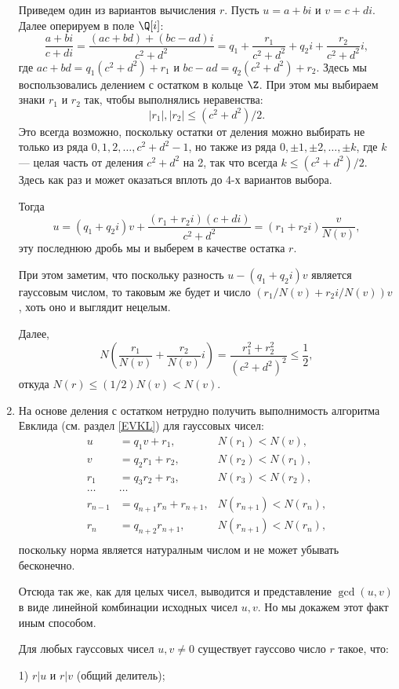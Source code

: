 \begin{enumerate}
Приведем один из вариантов вычисления $r$. Пусть $u=a+bi$ и $v=c+di$. Далее оперируем в поле $\Q[i]$:
$$
\frac{a+bi}{c+di}=\frac{(ac+bd)+(bc-ad)i}{c^2+d^2}=q_1+\frac{r_1}{c^2+d^2}+q_2i+\frac{r_2}{c^2+d^2}i,
$$
где $ac+bd=q_1(c^2+d^2)+r_1$ и $bc-ad=q_2(c^2+d^2)+r_2$. Здесь мы воспользовались делением с остатком в кольце $\Z$. При этом мы выбираем знаки $r_1$ и $r_2$ так, чтобы выполнялись неравенства:
$$
|r_1|,|r_2|\le (c^2+d^2)/2.
$$
Это всегда возможно, поскольку остатки от деления можно выбирать не только из ряда $0,1,2,\dots,c^2+d^2-1$, но также из ряда
$0,\pm 1,\pm 2,\dots,\pm k$, где $k$ --- целая часть от деления $c^2+d^2$ на 2, так что всегда $k\le(c^2+d^2)/2$. Здесь как раз и может оказаться вплоть до 4-х вариантов выбора.

Тогда
$$
u=(q_1+q_2i)v+\frac{(r_1+r_2i)(c+di)}{c^2+d^2}=(r_1+r_2i)\frac{v}{N(v)},
$$
эту последнюю дробь мы и выберем в качестве остатка $r$.

При этом заметим, что поскольку разность $u-(q_1+q_2i)v$ является гауссовым числом, то таковым же будет и число $(r_1/N(v)+r_2i/N(v))v$, хоть оно и выглядит нецелым.

Далее,
$$
N\left(\frac{r_1}{N(v)}+\frac{r_2}{N(v)}i\right)=\frac{r_1^2+r_2^2}{(c^2+d^2)^2}\le \frac 12,
$$
откуда $N(r)\le (1/2)N(v)<N(v)$.

\item На основе деления с остатком нетрудно получить выполнимость алгоритма Евклида (см. раздел \ref{EVKL}) для гауссовых чисел:
\begin{align*}
u & = q_1v + r_1, &  N(r_1)<N(v),\\
v & = q_2r_1 + r_2, &  N(r_2)<N(r_1),\\
r_1 & = q_3r_2 + r_3, &  N(r_3)<N(r_2),\\
\dots & \dots & \\
r_{n-1} & = q_{n+1}r_n + r_{n+1}, &  N(r_{n+1})<N(r_n),\\
r_{n} & = q_{n+2}r_{n+1}, &  N(r_{n+1})<N(r_n),\\
\end{align*}
поскольку норма является натуралным числом и не может убывать бесконечно.

Отсюда так же, как для целых чисел, выводится и представление $\gcd(u,v)$ в виде линейной комбинации исходных чисел $u,v$. Но мы докажем этот факт иным способом.
\begin{lem}\label{NOD}
Для любых гауссовых чисел $u,v\ne 0$ существует гауссово число $r$ такое, что:

\textup{1)} $r|u$ и $r|v$ (общий делитель);


\end{lem}
\end{enumerate}
